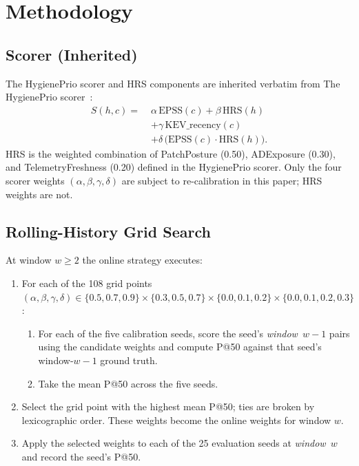 \section{Methodology}

\subsection{Scorer (Inherited)}

The HygienePrio scorer and HRS components are inherited verbatim from
The HygienePrio scorer~\cite{paper4hygieneprio}:
\begin{equation}
\begin{aligned}
S(h,c) =\;& \alpha\,\mathrm{EPSS}(c) + \beta\,\mathrm{HRS}(h) \\
 & + \gamma\,\mathrm{KEV\_recency}(c) \\
 & + \delta\,\bigl(\mathrm{EPSS}(c) \cdot \mathrm{HRS}(h)\bigr).
\end{aligned}
\label{eq:hp}
\end{equation}
HRS is the weighted combination of PatchPosture (0.50), ADExposure
(0.30), and TelemetryFreshness (0.20) defined in the HygienePrio scorer. Only the
four scorer weights $(\alpha, \beta, \gamma, \delta)$ are subject to
re-calibration in this paper; HRS weights are not.

\subsection{Rolling-History Grid Search}
\label{sec:rolling-grid}

At window $w \geq 2$ the \textsf{online} strategy executes:
\begin{enumerate}
\item For each of the 108 grid points
$(\alpha, \beta, \gamma, \delta) \in \{0.5, 0.7, 0.9\} \times
\{0.3, 0.5, 0.7\} \times \{0.0, 0.1, 0.2\} \times \{0.0, 0.1, 0.2, 0.3\}$:
\begin{enumerate}
\item For each of the five calibration seeds, score the seed's
\textit{window~$w-1$} pairs using the candidate weights and compute P@50
against that seed's window-$w-1$ ground truth.
\item Take the mean P@50 across the five seeds.
\end{enumerate}
\item Select the grid point with the highest mean P@50; ties are broken
by lexicographic order. These weights become the \textsf{online} weights
for window $w$.
\item Apply the selected weights to each of the 25 evaluation seeds at
\textit{window~$w$} and record the seed's P@50.
\end{enumerate}

